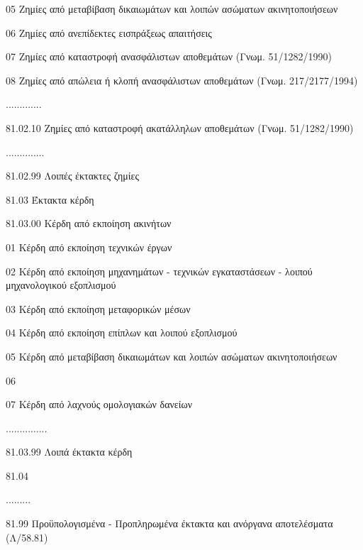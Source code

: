 \documentclass[A4,10pt,greek]{book}
\begin{document}
                               05    Ζημίες από μεταβίβαση δικαιωμάτων και λοιπών ασώματων
                                       ακινητοποιήσεων

                               06    Ζημίες από ανεπίδεκτες εισπράξεως απαιτήσεις

                               07    Ζημίες από καταστροφή ανασφάλιστων αποθεμάτων
                                       (Γνωμ. 51/1282/1990)

                               08    Ζημίες από απώλεια ή κλοπή ανασφάλιστων αποθεμάτων
                                      (Γνωμ. 217/2177/1994)

                     .............

                     81.02.10    Ζημίες από καταστροφή ακατάλληλων αποθεμάτων
                                      (Γνωμ. 51/1282/1990)

                     ..............

                     81.02.99    Λοιπές έκτακτες ζημίες

        81.03    Έκτακτα κέρδη

                    81.03.00    Κέρδη από εκποίηση ακινήτων

                               01    Κέρδη από εκποίηση τεχνικών έργων

                               02    Κέρδη από εκποίηση μηχανημάτων - τεχνικών εγκαταστάσεων
                                       - λοιπού μηχανολογικού εξοπλισμού

                               03    Κέρδη από εκποίηση μεταφορικών μέσων

                               04    Κέρδη από εκποίηση επίπλων και λοιπού εξοπλισμού

                               05    Κέρδη από μεταβίβαση δικαιωμάτων και λοιπών ασώματων
                                       ακινητοποιήσεων

                               06

                               07    Κέρδη από λαχνούς ομολογιακών δανείων

                     ...............

                     81.03.99    Λοιπά έκτακτα κέρδη

        81.04

        .........

        81.99    Προϋπολογισμένα - Προπληρωμένα έκτακτα και ανόργανα
                     αποτελέσματα (Λ/58.81)
\end{document}
